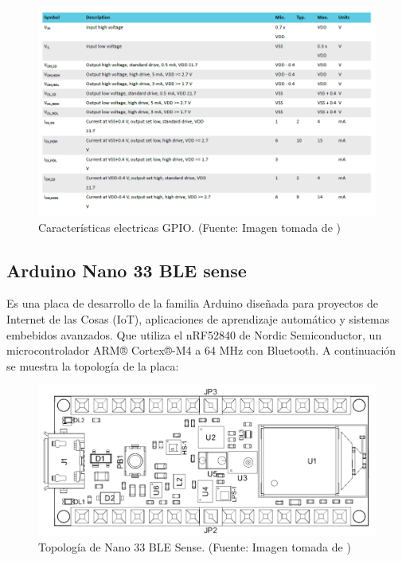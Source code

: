 \begin{figure}[H]
\centering
\includegraphics[scale=0.8]{./Figuras/Nota_teorica/GPIO_ELECTRICAL}
\caption{Características electricas GPIO. (Fuente: Imagen tomada de \cite{ST})}
\label{fig:ELEC2}
\end{figure}

\subsection{Arduino Nano 33 BLE sense}
Es una placa de desarrollo de la familia Arduino diseñada para proyectos de Internet de las Cosas (IoT), aplicaciones de aprendizaje automático y sistemas embebidos avanzados. Que utiliza el nRF52840 de Nordic Semiconductor, un microcontrolador ARM® Cortex®-M4 a 64 MHz con Bluetooth. A continuación se muestra la topología de la placa:
\begin{figure}[H]
\centering
\includegraphics[scale=0.8]{./Figuras/Nota_teorica/Board topology}
\caption{Topología de Nano 33 BLE Sense. (Fuente: Imagen tomada de \cite{arduino_nano33_ble_sense_datasheet})}
\label{fig:nano1}
\end{figure}

